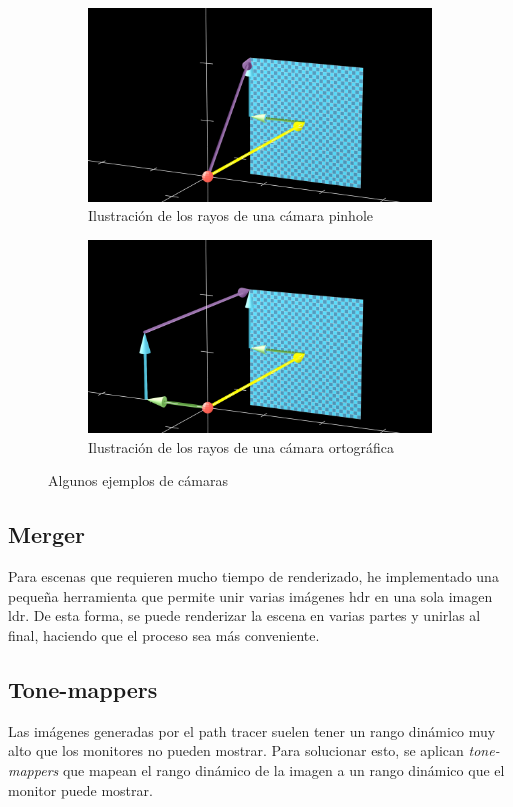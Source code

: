 \documentclass{article}
\begin{document}
\begin{figure}[H]
  \begin{subfigure}[h]{0.4\linewidth}
    \includegraphics[width=\linewidth]{imgs/pinhole.png}
    \caption{Ilustración de los rayos de una cámara pinhole}
  \end{subfigure}
  \hfill
  \begin{subfigure}[h]{0.4\linewidth}
    \includegraphics[width=\linewidth]{imgs/ortho.png}
    \caption{Ilustración de los rayos de una cámara ortográfica}
  \end{subfigure}
  \caption{Algunos ejemplos de cámaras}
\end{figure}

\subsection{Merger}
Para escenas que requieren mucho tiempo de renderizado, he implementado una
pequeña herramienta que permite unir varias imágenes hdr en una sola imagen ldr.
De esta forma, se puede renderizar la escena en varias partes y unirlas al
final, haciendo que el proceso sea más conveniente.

\subsection{Tone-mappers}
Las imágenes generadas por el path tracer suelen tener un rango dinámico muy
alto que los monitores no pueden mostrar. Para solucionar esto, se aplican
\textit{tone-mappers} que mapean el rango dinámico de la imagen a un rango
dinámico que el monitor puede mostrar.
\end{document}
